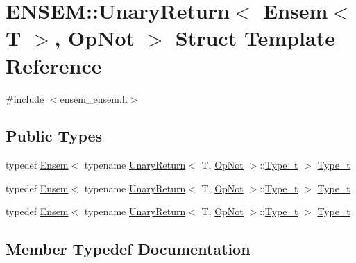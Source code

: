 \hypertarget{structENSEM_1_1UnaryReturn_3_01Ensem_3_01T_01_4_00_01OpNot_01_4}{}\section{E\+N\+S\+EM\+:\+:Unary\+Return$<$ Ensem$<$ T $>$, Op\+Not $>$ Struct Template Reference}
\label{structENSEM_1_1UnaryReturn_3_01Ensem_3_01T_01_4_00_01OpNot_01_4}


{\ttfamily \#include $<$ensem\+\_\+ensem.\+h$>$}

\subsection*{Public Types}
\begin{DoxyCompactItemize}
\item 
typedef \mbox{\hyperlink{classENSEM_1_1Ensem}{Ensem}}$<$ typename \mbox{\hyperlink{structENSEM_1_1UnaryReturn}{Unary\+Return}}$<$ T, \mbox{\hyperlink{structENSEM_1_1OpNot}{Op\+Not}} $>$\+::\mbox{\hyperlink{structENSEM_1_1UnaryReturn_3_01Ensem_3_01T_01_4_00_01OpNot_01_4_a858a31d9b2f5ae17601e7f83f0a58f5a}{Type\+\_\+t}} $>$ \mbox{\hyperlink{structENSEM_1_1UnaryReturn_3_01Ensem_3_01T_01_4_00_01OpNot_01_4_a858a31d9b2f5ae17601e7f83f0a58f5a}{Type\+\_\+t}}
\item 
typedef \mbox{\hyperlink{classENSEM_1_1Ensem}{Ensem}}$<$ typename \mbox{\hyperlink{structENSEM_1_1UnaryReturn}{Unary\+Return}}$<$ T, \mbox{\hyperlink{structENSEM_1_1OpNot}{Op\+Not}} $>$\+::\mbox{\hyperlink{structENSEM_1_1UnaryReturn_3_01Ensem_3_01T_01_4_00_01OpNot_01_4_a858a31d9b2f5ae17601e7f83f0a58f5a}{Type\+\_\+t}} $>$ \mbox{\hyperlink{structENSEM_1_1UnaryReturn_3_01Ensem_3_01T_01_4_00_01OpNot_01_4_a858a31d9b2f5ae17601e7f83f0a58f5a}{Type\+\_\+t}}
\item 
typedef \mbox{\hyperlink{classENSEM_1_1Ensem}{Ensem}}$<$ typename \mbox{\hyperlink{structENSEM_1_1UnaryReturn}{Unary\+Return}}$<$ T, \mbox{\hyperlink{structENSEM_1_1OpNot}{Op\+Not}} $>$\+::\mbox{\hyperlink{structENSEM_1_1UnaryReturn_3_01Ensem_3_01T_01_4_00_01OpNot_01_4_a858a31d9b2f5ae17601e7f83f0a58f5a}{Type\+\_\+t}} $>$ \mbox{\hyperlink{structENSEM_1_1UnaryReturn_3_01Ensem_3_01T_01_4_00_01OpNot_01_4_a858a31d9b2f5ae17601e7f83f0a58f5a}{Type\+\_\+t}}
\end{DoxyCompactItemize}


\subsection{Member Typedef Documentation}
\mbox{\label{structENSEM_1_1UnaryReturn_3_01Ensem_3_01T_01_4_00_01OpNot_01_4_a858a31d9b2f5ae17601e7f83f0a58f5a}} 
